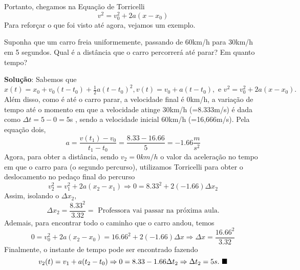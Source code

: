 \documentclass[PhysicsI/physics_notes.tex]{subfiles}
\begin{document}
 Portanto, chegamos na Equação de Torricelli
  $$
  \boxed{v^{2} = v_{0}^{2} + 2a(x-x_{0})}
  $$
  Para reforçar o que foi visto até agora, vejamos um exemplo.
 \begin{example}
   Suponha que um carro freia uniformemente, passando de 60km/h para 30km/h em 5 segundos. Qual é a distância
que o carro percorrerá até parar? Em quanto tempo?

  \textbf{Solução}: Sabemos que $x(t) = x_{0} + v_{0}(t-t_{0}) + \frac{1}{2}a(t-t_{0})^{2}, v(t) = v_{0} + a(t-t_{0}),
\text{ e }v^{2} = v_{0}^{2} + 2a(x-x_{0}).$ Além disso, como é até o carro parar, a velocidade final é 0km/h, a variação
de tempo até o momento em que a velocidade atinge 30km/h (=8.333m/s) é dada como $\Delta t = 5 - 0 = 5$s , sendo a velocidade inicial 60km/h (=16,666m/s). 
Pela equação dois, 
  $$
    a = \frac{v(t_{1}) - v_{0}}{t_{1}-t_{0}} = \frac{8.33 - 16.66}{5} = -1.66\frac{m}{s^{2}}
  $$
  Agora, para obter a distância, sendo $v_{2} = 0km/h$ o valor da aceleração no tempo em que o carro para (o segundo percurso),
utilizamos Torricelli para obter o deslocamento no pedaço final do percurso
  $$
    v_{2}^{2} = v_{1}^{2} + 2a(x_{2}-x_{1}) \Rightarrow 0 = 8.33^{2} + 2(-1.66)\Delta x_{2}
  $$
  Assim, isolando o $\Delta x_{2},$  
    $$
    \Delta x_{2} = \frac{8.33^{2}}{3.32} = \text{ Professora vai passar na próxima aula.}
    $$
  Ademais, para encontrar todo o caminho que o carro andou, temos 
    $$
      0 = v_{0}^{2} + 2a(x_{2} - x_{0}) = 16.66^{2} + 2(-1.66)\Delta x \Rightarrow \Delta x = \frac{16.66^{2}}{3.32}
    $$
  Finalmente, o instante de tempo pode ser encontrado fazendo 
    $$
    v_{2}(t) = v_{1} + a(t_{2}-t_{0}) \Rightarrow 0 = 8.33 - 1.66\Delta t_{2} \Rightarrow \Delta t_{2} = 5s.\text{ $\blacksquare$}
    $$
 \end{example}
\end{document}
